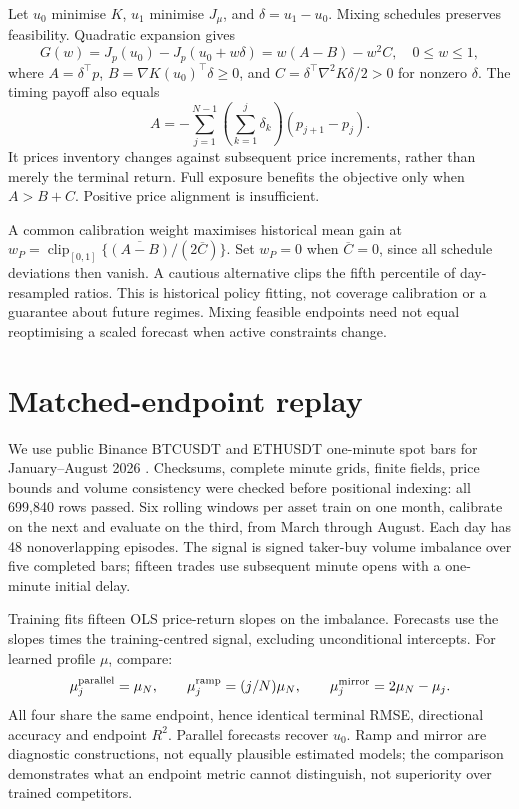 \documentclass[11pt]{article}
\begin{document}
Let $u_0$ minimise $K$, $u_1$ minimise $J_\mu$, and $\delta=u_1-u_0$. Mixing schedules preserves feasibility. Quadratic expansion gives
\begin{equation}
G(w)=J_p(u_0)-J_p(u_0+w\delta)
=w(A-B)-w^2C,\quad 0\leq w\leq1,
\label{eq:gain}
\end{equation}
where $A=\delta^\top p$, $B=\nabla K(u_0)^\top\delta\geq0$, and $C=\delta^\top\nabla^2K\delta/2>0$ for nonzero $\delta$. The timing payoff also equals
\begin{equation}
A=-\sum_{j=1}^{N-1}\left(\sum_{k=1}^{j}\delta_k\right)(p_{j+1}-p_j).
\end{equation}
It prices inventory changes against subsequent price increments, rather than merely the terminal return. Full exposure benefits the objective only when $A>B+C$. Positive price alignment is insufficient.

A common calibration weight maximises historical mean gain at
$w_P=\operatorname{clip}_{[0,1]}\{\overline{(A-B)}/(2\overline C)\}$.
Set $w_P=0$ when $\overline C=0$, since all schedule deviations then vanish. A cautious alternative clips the fifth percentile of day-resampled ratios. This is historical policy fitting, not coverage calibration or a guarantee about future regimes. Mixing feasible endpoints need not equal reoptimising a scaled forecast when active constraints change.

\section{Matched-endpoint replay}
We use public Binance BTCUSDT and ETHUSDT one-minute spot bars for January--August 2026 \citep{binance2026}. Checksums, complete minute grids, finite fields, price bounds and volume consistency were checked before positional indexing: all 699,840 rows passed. Six rolling windows per asset train on one month, calibrate on the next and evaluate on the third, from March through August. Each day has 48 nonoverlapping episodes. The signal is signed taker-buy volume imbalance over five completed bars; fifteen trades use subsequent minute opens with a one-minute initial delay.

Training fits fifteen OLS price-return slopes on the imbalance. Forecasts use the slopes times the training-centred signal, excluding unconditional intercepts. For learned profile $\mu$, compare:
\begin{equation}
\mu^{\rm parallel}_j=\mu_N,\qquad
\mu^{\rm ramp}_j=(j/N)\mu_N,\qquad
\mu^{\rm mirror}_j=2\mu_N-\mu_j.
\end{equation}
All four share the same endpoint, hence identical terminal RMSE, directional accuracy and endpoint $R^2$. Parallel forecasts recover $u_0$. Ramp and mirror are diagnostic constructions, not equally plausible estimated models; the comparison demonstrates what an endpoint metric cannot distinguish, not superiority over trained competitors.
\end{document}
